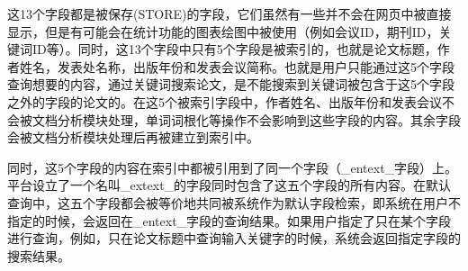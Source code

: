     这13个字段都是被保存(STORE)的字段，它们虽然有一些并不会在网页中被直接显示，但是有可能会在统计功能的图表绘图中被使用（例如会议ID，期刊ID，关键词ID等）。同时，这13个字段中只有5个字段是被索引的，也就是论文标题，作者姓名，发表处名称，出版年份和发表会议简称。也就是用户只能通过这5个字段查询想要的内容，通过关键词搜索论文，是不能搜索到关键词被包含于这5个字段之外的字段的论文的。在这5个被索引字段中，作者姓名、出版年份和发表会议不会被文档分析模块处理，单词词根化等操作不会影响到这些字段的内容。其余字段会被文档分析模块处理后再被建立到索引中。

    同时，这5个字段的内容在索引中都被引用到了同一个字段（\_entext\_字段）上。平台设立了一个名叫\_extext\_的字段同时包含了这五个字段的所有内容。在默认查询中，这五个字段都会被等价地共同被系统作为默认字段检索，即系统在用户不指定的时候，会返回在\_entext\_字段的查询结果。如果用户指定了只在某个字段进行查询，例如，只在论文标题中查询输入关键字的时候，系统会返回指定字段的搜索结果。